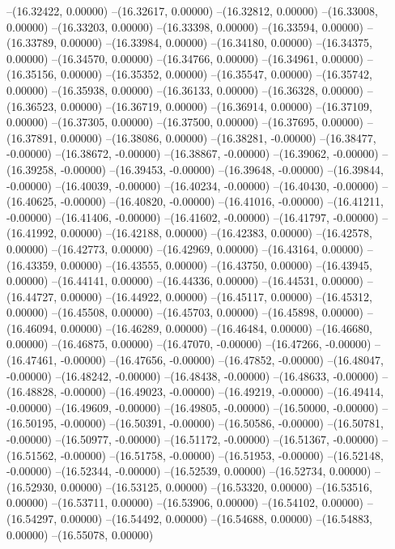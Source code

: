 --(16.32422, 0.00000)
--(16.32617, 0.00000)
--(16.32812, 0.00000)
--(16.33008, 0.00000)
--(16.33203, 0.00000)
--(16.33398, 0.00000)
--(16.33594, 0.00000)
--(16.33789, 0.00000)
--(16.33984, 0.00000)
--(16.34180, 0.00000)
--(16.34375, 0.00000)
--(16.34570, 0.00000)
--(16.34766, 0.00000)
--(16.34961, 0.00000)
--(16.35156, 0.00000)
--(16.35352, 0.00000)
--(16.35547, 0.00000)
--(16.35742, 0.00000)
--(16.35938, 0.00000)
--(16.36133, 0.00000)
--(16.36328, 0.00000)
--(16.36523, 0.00000)
--(16.36719, 0.00000)
--(16.36914, 0.00000)
--(16.37109, 0.00000)
--(16.37305, 0.00000)
--(16.37500, 0.00000)
--(16.37695, 0.00000)
--(16.37891, 0.00000)
--(16.38086, 0.00000)
--(16.38281, -0.00000)
--(16.38477, -0.00000)
--(16.38672, -0.00000)
--(16.38867, -0.00000)
--(16.39062, -0.00000)
--(16.39258, -0.00000)
--(16.39453, -0.00000)
--(16.39648, -0.00000)
--(16.39844, -0.00000)
--(16.40039, -0.00000)
--(16.40234, -0.00000)
--(16.40430, -0.00000)
--(16.40625, -0.00000)
--(16.40820, -0.00000)
--(16.41016, -0.00000)
--(16.41211, -0.00000)
--(16.41406, -0.00000)
--(16.41602, -0.00000)
--(16.41797, -0.00000)
--(16.41992, 0.00000)
--(16.42188, 0.00000)
--(16.42383, 0.00000)
--(16.42578, 0.00000)
--(16.42773, 0.00000)
--(16.42969, 0.00000)
--(16.43164, 0.00000)
--(16.43359, 0.00000)
--(16.43555, 0.00000)
--(16.43750, 0.00000)
--(16.43945, 0.00000)
--(16.44141, 0.00000)
--(16.44336, 0.00000)
--(16.44531, 0.00000)
--(16.44727, 0.00000)
--(16.44922, 0.00000)
--(16.45117, 0.00000)
--(16.45312, 0.00000)
--(16.45508, 0.00000)
--(16.45703, 0.00000)
--(16.45898, 0.00000)
--(16.46094, 0.00000)
--(16.46289, 0.00000)
--(16.46484, 0.00000)
--(16.46680, 0.00000)
--(16.46875, 0.00000)
--(16.47070, -0.00000)
--(16.47266, -0.00000)
--(16.47461, -0.00000)
--(16.47656, -0.00000)
--(16.47852, -0.00000)
--(16.48047, -0.00000)
--(16.48242, -0.00000)
--(16.48438, -0.00000)
--(16.48633, -0.00000)
--(16.48828, -0.00000)
--(16.49023, -0.00000)
--(16.49219, -0.00000)
--(16.49414, -0.00000)
--(16.49609, -0.00000)
--(16.49805, -0.00000)
--(16.50000, -0.00000)
--(16.50195, -0.00000)
--(16.50391, -0.00000)
--(16.50586, -0.00000)
--(16.50781, -0.00000)
--(16.50977, -0.00000)
--(16.51172, -0.00000)
--(16.51367, -0.00000)
--(16.51562, -0.00000)
--(16.51758, -0.00000)
--(16.51953, -0.00000)
--(16.52148, -0.00000)
--(16.52344, -0.00000)
--(16.52539, 0.00000)
--(16.52734, 0.00000)
--(16.52930, 0.00000)
--(16.53125, 0.00000)
--(16.53320, 0.00000)
--(16.53516, 0.00000)
--(16.53711, 0.00000)
--(16.53906, 0.00000)
--(16.54102, 0.00000)
--(16.54297, 0.00000)
--(16.54492, 0.00000)
--(16.54688, 0.00000)
--(16.54883, 0.00000)
--(16.55078, 0.00000)
